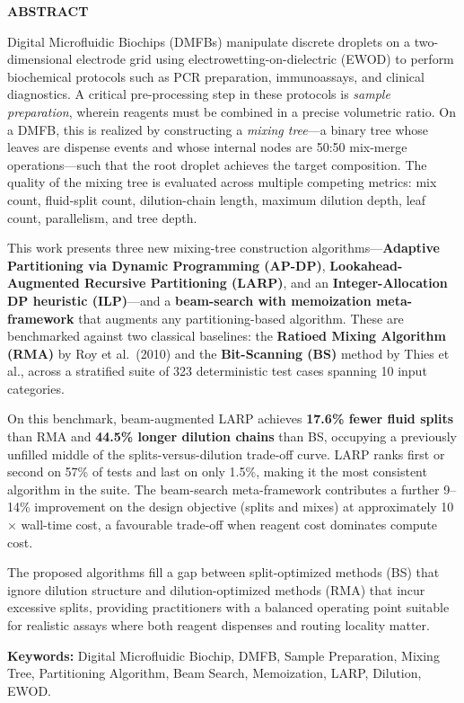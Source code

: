 \begin{center}
\textbf{\Large ABSTRACT}
\end{center}

\vspace{1cm}

Digital Microfluidic Biochips (DMFBs) manipulate discrete droplets on a two-dimensional electrode grid using electrowetting-on-dielectric (EWOD) to perform biochemical protocols such as PCR preparation, immunoassays, and clinical diagnostics. A critical pre-processing step in these protocols is \textit{sample preparation}, wherein reagents must be combined in a precise volumetric ratio. On a DMFB, this is realized by constructing a \textit{mixing tree}---a binary tree whose leaves are dispense events and whose internal nodes are 50:50 mix-merge operations---such that the root droplet achieves the target composition. The quality of the mixing tree is evaluated across multiple competing metrics: mix count, fluid-split count, dilution-chain length, maximum dilution depth, leaf count, parallelism, and tree depth.

This work presents three new mixing-tree construction algorithms---\textbf{Adaptive Partitioning via Dynamic Programming (AP-DP)}, \textbf{Lookahead-Augmented Recursive Partitioning (LARP)}, and an \textbf{Integer-Allocation DP heuristic (ILP)}---and a \textbf{beam-search with memoization meta-framework} that augments any partitioning-based algorithm. These are benchmarked against two classical baselines: the \textbf{Ratioed Mixing Algorithm (RMA)} by Roy et al.\ (2010) and the \textbf{Bit-Scanning (BS)} method by Thies et al., across a stratified suite of 323 deterministic test cases spanning 10 input categories.

On this benchmark, beam-augmented LARP achieves \textbf{17.6\% fewer fluid splits} than RMA and \textbf{44.5\% longer dilution chains} than BS, occupying a previously unfilled middle of the splits-versus-dilution trade-off curve. LARP ranks first or second on 57\% of tests and last on only 1.5\%, making it the most consistent algorithm in the suite. The beam-search meta-framework contributes a further 9--14\% improvement on the design objective (splits and mixes) at approximately 10$\times$ wall-time cost, a favourable trade-off when reagent cost dominates compute cost.

The proposed algorithms fill a gap between split-optimized methods (BS) that ignore dilution structure and dilution-optimized methods (RMA) that incur excessive splits, providing practitioners with a balanced operating point suitable for realistic assays where both reagent dispenses and routing locality matter.

\vspace{0.5cm}

\noindent\textbf{Keywords:} Digital Microfluidic Biochip, DMFB, Sample Preparation, Mixing Tree, Partitioning Algorithm, Beam Search, Memoization, LARP, Dilution, EWOD.
